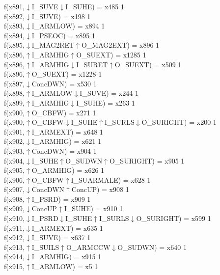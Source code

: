 f(x891,$\downarrow$I\_SUVE$\downarrow$I\_SUHE) = x485 {1} \\
f(x892,$\downarrow$I\_SUVE) = x198 {1} \\
f(x893,$\downarrow$I\_ARMLOW) = x894 {1} \\
f(x894,$\downarrow$I\_PSEOC) = x895 {1} \\
f(x895,$\downarrow$I\_MAG2RET$\uparrow$O\_MAG2EXT) = x896 {1} \\
f(x896,$\uparrow$I\_ARMHIG$\uparrow$O\_SUEXT) = x1285 {1} \\
f(x896,$\uparrow$I\_ARMHIG$\downarrow$I\_SURET$\uparrow$O\_SUEXT) = x509 {1} \\
f(x896,$\uparrow$O\_SUEXT) = x1228 {1} \\
f(x897,$\downarrow$ConcDWN) = x530 {1} \\
f(x898,$\uparrow$I\_ARMLOW$\downarrow$I\_SUVE) = x244 {1} \\
f(x899,$\uparrow$I\_ARMHIG$\downarrow$I\_SUHE) = x263 {1} \\
f(x900,$\uparrow$O\_CBFW) = x271 {1} \\
f(x900,$\uparrow$O\_CBFW$\downarrow$I\_SUHE$\uparrow$I\_SURLS$\downarrow$O\_SURIGHT) = x200 {1} \\
f(x901,$\uparrow$I\_ARMEXT) = x648 {1} \\
f(x902,$\downarrow$I\_ARMHIG) = x621 {1} \\
f(x903,$\uparrow$ConcDWN) = x904 {1} \\
f(x904,$\downarrow$I\_SUHE$\uparrow$O\_SUDWN$\uparrow$O\_SURIGHT) = x905 {1} \\
f(x905,$\uparrow$O\_ARMHIG) = x626 {1} \\
f(x906,$\uparrow$O\_CBFW$\uparrow$I\_SUARMALE) = x628 {1} \\
f(x907,$\downarrow$ConcDWN$\uparrow$ConcUP) = x908 {1} \\
f(x908,$\uparrow$I\_PSRD) = x909 {1} \\
f(x909,$\downarrow$ConcUP$\uparrow$I\_SUHE) = x910 {1} \\
f(x910,$\downarrow$I\_PSRD$\downarrow$I\_SUHE$\uparrow$I\_SURLS$\downarrow$O\_SURIGHT) = x599 {1} \\
f(x911,$\downarrow$I\_ARMEXT) = x635 {1} \\
f(x912,$\downarrow$I\_SUVE) = x637 {1} \\
f(x913,$\uparrow$I\_SUILS$\uparrow$O\_ARMCCW$\downarrow$O\_SUDWN) = x640 {1} \\
f(x914,$\downarrow$I\_ARMHIG) = x915 {1} \\
f(x915,$\uparrow$I\_ARMLOW) = x5 {1} \\
